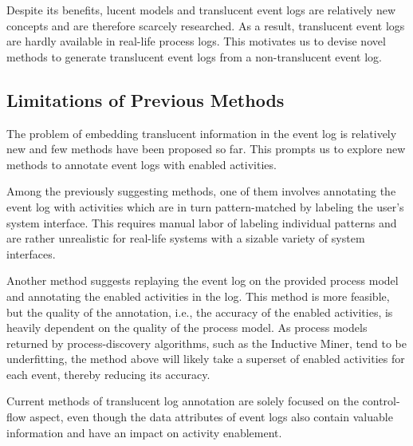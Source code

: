 
Despite its benefits, lucent models and translucent event logs are relatively new concepts and are therefore scarcely researched. As a result, translucent event logs are hardly available in real-life process logs. This motivates us to devise novel methods to generate translucent event logs from a non-translucent event log.

\subsection{Limitations of Previous Methods}

The problem of embedding translucent information in the event log is relatively new and few methods have been proposed so far. This prompts us to explore new methods to annotate event logs with enabled activities.

Among the previously suggesting methods, one of them involves annotating the event log with activities which are in turn pattern-matched by labeling the user's system interface. This requires manual labor of labeling individual patterns and are rather unrealistic for real-life systems with a sizable variety of system interfaces.

Another method suggests replaying the event log on the provided process model and annotating the enabled activities in the log. This method is more feasible, but the quality of the annotation, i.e., the accuracy of the enabled activities, is heavily dependent on the quality of the process model. As process models returned by process-discovery algorithms, such as the Inductive Miner, tend to be underfitting, the method above will likely take a superset of enabled activities for each event, thereby reducing its accuracy.

Current methods of translucent log annotation are solely focused on the control-flow aspect, even though the data attributes of event logs also contain valuable information and have an impact on activity enablement.  

